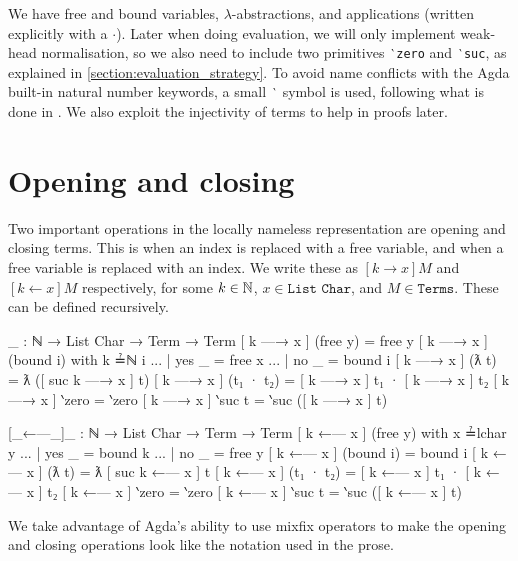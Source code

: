 We have free and bound variables, $\lambda$-abstractions, and applications (written explicitly with
a $\cdot$). Later when doing evaluation, we will only implement weak-head normalisation, so we also
need to include two primitives \texttt{‵zero} and \texttt{‵suc}, as explained in
\ref{section:evaluation_strategy}. To avoid name conflicts with the Agda built-in natural number
keywords, a small \texttt{‵} symbol is used, following what is done in
\citet{wadler_programming_2022}. We also exploit the injectivity of terms to help in proofs later.

\section{Opening and closing}
\label{appendix:opening_and_closing}
Two important operations in the locally nameless representation are
opening and closing terms. This is when an index is replaced with a free variable, and when a free
variable is replaced with an index. We write these as $[k \to x] M$ and $[k \leftarrow x] M$
respectively, for some $k \in \operatorname{\mathbb{N}}$, $x \in \texttt{List Char}$, and $M \in \texttt{Terms}$. These
can be defined recursively.
\begin{code}
  [_—→_]_ : ℕ → List Char → Term → Term
  [ k —→ x ] (free y) = free y
  [ k —→ x ] (bound i) with k ≟ℕ i
  ... | yes _ = free x
  ... | no  _ = bound i
  [ k —→ x ] (ƛ t) = ƛ ([ suc k —→ x ] t)
  [ k —→ x ] (t₁ · t₂) = [ k —→ x ] t₁ · [ k —→ x ] t₂
  [ k —→ x ] ‵zero = ‵zero
  [ k —→ x ] ‵suc t = ‵suc ([ k —→ x ] t)

  [_←—_]_ : ℕ → List Char → Term → Term
  [ k ←— x ] (free y) with x ≟lchar y
  ... | yes _ = bound k
  ... | no  _ = free y
  [ k ←— x ] (bound i) = bound i
  [ k ←— x ] (ƛ t) = ƛ [ suc k ←— x ] t
  [ k ←— x ] (t₁ · t₂) = [ k ←— x ] t₁ · [ k ←— x ] t₂
  [ k ←— x ] ‵zero = ‵zero
  [ k ←— x ] ‵suc t = ‵suc ([ k ←— x ] t)
\end{code}
We take advantage of Agda's ability to use mixfix operators to make the opening and closing
operations look like the notation used in the prose.


